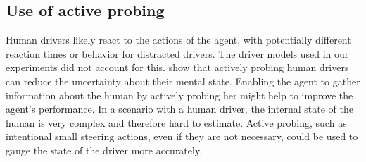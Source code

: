 \subsection{Use of active probing}

Human drivers likely react to the actions of the agent, with potentially different reaction times or behavior for distracted drivers. The driver models used in our experiments did not account for this. \cite{att_intersec} show that actively probing human drivers can reduce the uncertainty about their mental state. Enabling the agent to gather information about the human by actively probing her might help to improve the agent's performance. In a scenario with a human driver, the internal state of the human is very complex and therefore hard to estimate. Active probing, such as intentional small steering actions, even if they are not necessary, could be used to gauge the state of the driver more accurately.


